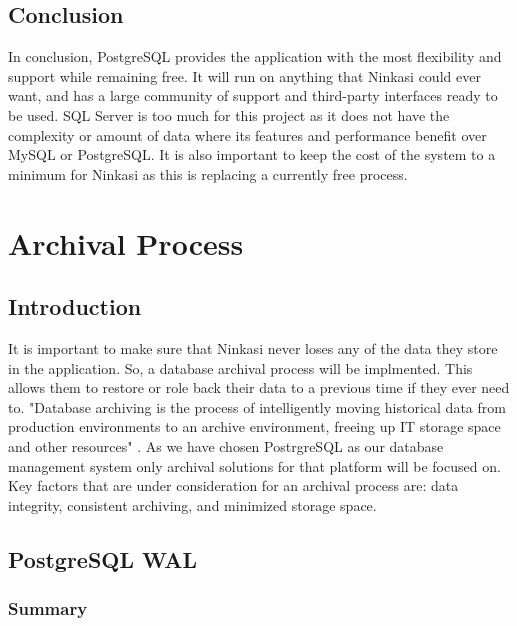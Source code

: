 \documentclass[draftclsnofoot,onecolumn,journal,letterpaper,compsoc,10pt]{IEEEtran}
\begin{document}
    \subsection{Conclusion}

    In conclusion, PostgreSQL provides the application with the most flexibility and support while remaining free.  It will run on anything that Ninkasi could ever want, and has a large community of support and third-party interfaces ready to be used.  SQL Server is too much for this project as it does not have the complexity or amount of data where its features and performance benefit over MySQL or PostgreSQL.  It is also important to keep the cost of the system to a minimum for Ninkasi as this is replacing a currently free process.

\section{Archival Process}

    \subsection{Introduction}
    
    It is important to make sure that Ninkasi never loses any of the data they store in the application.  So, a database archival process will be implmented.  This allows them to restore or role back their data to a previous time if they ever need to.  "Database archiving is the process of intelligently moving historical data from production environments to an archive environment, freeing up IT storage space and other resources" \cite{ibm_archiving}.  As we have chosen PostrgreSQL as our database management system only archival solutions for that platform will be focused on.  Key factors that are under consideration for an archival process are: data integrity, consistent archiving, and minimized storage space.
    
    \subsection{PostgreSQL WAL}
    
        \subsubsection{Summary}
        
\end{document}
